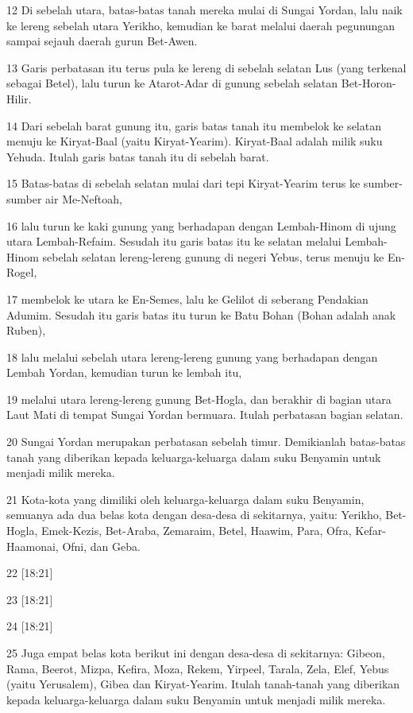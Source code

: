 \par 12 Di sebelah utara, batas-batas tanah mereka mulai di Sungai Yordan, lalu naik ke lereng sebelah utara Yerikho, kemudian ke barat melalui daerah pegunungan sampai sejauh daerah gurun Bet-Awen.
\par 13 Garis perbatasan itu terus pula ke lereng di sebelah selatan Lus (yang terkenal sebagai Betel), lalu turun ke Atarot-Adar di gunung sebelah selatan Bet-Horon-Hilir.
\par 14 Dari sebelah barat gunung itu, garis batas tanah itu membelok ke selatan menuju ke Kiryat-Baal (yaitu Kiryat-Yearim). Kiryat-Baal adalah milik suku Yehuda. Itulah garis batas tanah itu di sebelah barat.
\par 15 Batas-batas di sebelah selatan mulai dari tepi Kiryat-Yearim terus ke sumber-sumber air Me-Neftoah,
\par 16 lalu turun ke kaki gunung yang berhadapan dengan Lembah-Hinom di ujung utara Lembah-Refaim. Sesudah itu garis batas itu ke selatan melalui Lembah-Hinom sebelah selatan lereng-lereng gunung di negeri Yebus, terus menuju ke En-Rogel,
\par 17 membelok ke utara ke En-Semes, lalu ke Gelilot di seberang Pendakian Adumim. Sesudah itu garis batas itu turun ke Batu Bohan (Bohan adalah anak Ruben),
\par 18 lalu melalui sebelah utara lereng-lereng gunung yang berhadapan dengan Lembah Yordan, kemudian turun ke lembah itu,
\par 19 melalui utara lereng-lereng gunung Bet-Hogla, dan berakhir di bagian utara Laut Mati di tempat Sungai Yordan bermuara. Itulah perbatasan bagian selatan.
\par 20 Sungai Yordan merupakan perbatasan sebelah timur. Demikianlah batas-batas tanah yang diberikan kepada keluarga-keluarga dalam suku Benyamin untuk menjadi milik mereka.
\par 21 Kota-kota yang dimiliki oleh keluarga-keluarga dalam suku Benyamin, semuanya ada dua belas kota dengan desa-desa di sekitarnya, yaitu: Yerikho, Bet-Hogla, Emek-Kezis, Bet-Araba, Zemaraim, Betel, Haawim, Para, Ofra, Kefar-Haamonai, Ofni, dan Geba.
\par 22 [18:21]
\par 23 [18:21]
\par 24 [18:21]
\par 25 Juga empat belas kota berikut ini dengan desa-desa di sekitarnya: Gibeon, Rama, Beerot, Mizpa, Kefira, Moza, Rekem, Yirpeel, Tarala, Zela, Elef, Yebus (yaitu Yerusalem), Gibea dan Kiryat-Yearim. Itulah tanah-tanah yang diberikan kepada keluarga-keluarga dalam suku Benyamin untuk menjadi milik mereka.

